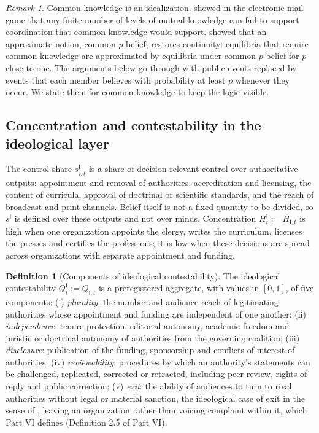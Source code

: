 \documentclass[11pt,letterpaper]{article}
\theoremstyle{definition}
\newtheorem{definition}[theorem]{Definition}
\theoremstyle{remark}
\newtheorem{remark}[theorem]{Remark}
\newcommand{\pI}{\mathsf{I}}
\begin{document}
\begin{remark}
Common knowledge is an idealization. \citet{rubinstein1992} showed in the electronic mail game that any finite number of levels of mutual knowledge can fail to support coordination that common knowledge would support. \citet{monderer1989} showed that an approximate notion, common $p$-belief, restores continuity: equilibria that require common knowledge are approximated by equilibria under common $p$-belief for $p$ close to one. The arguments below go through with public events replaced by events that each member believes with probability at least $p$ whenever they occur. We state them for common knowledge to keep the logic visible.
\end{remark}

\subsection{Concentration and contestability in the ideological layer}

The control share $s^{\pI}_{i,t}$ is a share of decision-relevant control over authoritative outputs: appointment and removal of authorities, accreditation and licensing, the content of curricula, approval of doctrinal or scientific standards, and the reach of broadcast and print channels. Belief itself is not a fixed quantity to be divided, so $s^{\pI}$ is defined over these outputs and not over minds. Concentration $H^{\pI}_t:=H_{\pI,t}$ is high when one organization appoints the clergy, writes the curriculum, licenses the presses and certifies the professions; it is low when these decisions are spread across organizations with separate appointment and funding.

\begin{definition}[Components of ideological contestability]
\label{def:ideological-power:qi}
The ideological contestability $Q^{\pI}_t:=Q_{\pI,t}$ is a preregistered aggregate, with values in $[0,1]$, of five components:
(i) \emph{plurality}: the number and audience reach of legitimating authorities whose appointment and funding are independent of one another;
(ii) \emph{independence}: tenure protection, editorial autonomy, academic freedom and juristic or doctrinal autonomy of authorities from the governing coalition;
(iii) \emph{disclosure}: publication of the funding, sponsorship and conflicts of interest of authorities;
(iv) \emph{reviewability}: procedures by which an authority's statements can be challenged, replicated, corrected or retracted, including peer review, rights of reply and public correction;
(v) \emph{exit}: the ability of audiences to turn to rival authorities without legal or material sanction, the ideological case of exit in the sense of \citet{hirschman1970}, leaving an organization rather than voicing complaint within it, which Part VI defines (Definition 2.5 of Part VI).
\end{definition}
\end{document}
